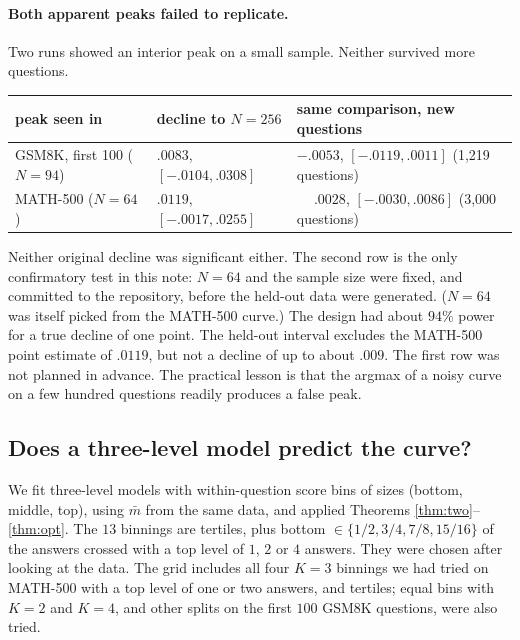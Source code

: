 \documentclass[11pt]{article}
\theoremstyle{definition}
\theoremstyle{remark}
\begin{document}
\paragraph{Both apparent peaks failed to replicate.}
Two runs showed an interior peak on a small sample. Neither survived more questions.

\begin{center}
\small
\small
\begin{tabular}{lll}
\toprule
peak seen in & decline to $N=256$ & same comparison, new questions \\
\midrule
GSM8K, first 100 ($N=94$) & $.0083$, $[-.0104,.0308]$ & $-.0053$, $[-.0119,.0011]$ (1{,}219 questions) \\
MATH-500 ($N=64$) & $.0119$, $[-.0017,.0255]$ & $\phantom{-}.0028$, $[-.0030,.0086]$ (3{,}000 questions) \\
\bottomrule
\end{tabular}
\end{center}

\noindent Neither original decline was significant either. The second row is the only confirmatory test in this note:
$N=64$ and the sample size were fixed, and committed to the repository, before the held-out data
were generated. ($N=64$ was itself picked from the MATH-500 curve.) The design had about $94\%$ power for a true decline of one point. The held-out interval excludes the MATH-500 point
estimate of $.0119$, but not a decline of up to about $.009$. The first row was not planned in advance.
The practical lesson is that the argmax of a noisy curve on a few hundred questions readily produces a false peak.

\subsection{Does a three-level model predict the curve?}

We fit three-level models with within-question score bins of sizes (bottom, middle, top), using $\bar m$ from the same data, and applied
Theorems \ref{thm:two}--\ref{thm:opt}. The $13$ binnings are tertiles, plus bottom $\in\{1/2,3/4,7/8,15/16\}$
of the answers crossed with a top level of $1$, $2$ or $4$ answers. They were chosen after looking at the data. The grid
includes all four $K=3$ binnings we had tried on MATH-500 with a top level of one or two answers, and tertiles; equal bins with $K=2$ and $K=4$, and other
splits on the first $100$ GSM8K questions, were also tried.
\end{document}
